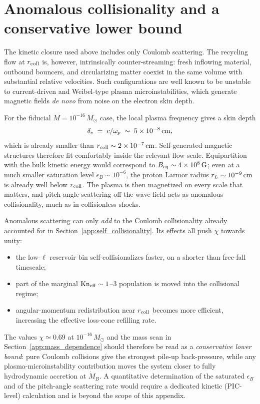 \documentclass[12pt]{article}
\newcommand{\Msun}{M_\odot}
\newcommand{\MdotB}{\dot{M}_B}
\newcommand{\rcoll}{r_{\rm coll}}
\newcommand{\Kn}{\mathrm{Kn}}
\begin{document}
\section{Anomalous collisionality and a conservative lower bound}
\label{app:anomalous}

The kinetic closure used above includes only Coulomb scattering. The
recycling flow at $\rcoll$ is, however, intrinsically counter-streaming:
fresh inflowing material, outbound bouncers, and circularizing matter
coexist in the same volume with substantial relative velocities. Such
configurations are well known to be unstable to current-driven and
Weibel-type plasma microinstabilities, which generate magnetic fields
\emph{de novo} from noise on the electron skin depth.

For the fiducial $M=10^{-16}\,\Msun$ case, the local plasma frequency
gives a skin depth
\begin{equation}
  \delta_e \;=\; c/\omega_p
  \;\sim\; 5\times10^{-8}\,{\rm cm},
\end{equation}
which is already smaller than $\rcoll\sim2\times10^{-7}\,{\rm cm}$.
Self-generated magnetic structures therefore fit comfortably inside
the relevant flow scale. Equipartition with the bulk kinetic energy
would correspond to $B_{\rm eq}\sim4\times10^{8}\,{\rm G}$; even at a
much smaller saturation level $\epsilon_B\sim10^{-6}$, the proton
Larmor radius $r_L\sim10^{-9}\,{\rm cm}$ is already well below
$\rcoll$. The plasma is then magnetized on every scale that matters,
and pitch-angle scattering off the wave field acts as anomalous
collisionality, much as in collisionless shocks.

Anomalous scattering can only \emph{add} to the Coulomb collisionality
already accounted for in Section~\ref{app:self_collisionality}. Its
effects all push $\chi$ towards unity:
\begin{itemize}
\item the low-$\ell$ reservoir bin self-collisionalizes faster, on a
shorter than free-fall timescale;
\item part of the marginal $\Kn_{\rm eff}\sim1$--$3$ population is
moved into the collisional regime;
\item angular-momentum redistribution near $\rcoll$ becomes more
efficient, increasing the effective loss-cone refilling rate.
\end{itemize}
The values $\chi\simeq0.69$ at $10^{-16}\,\Msun$ and the mass scan in
Section~\ref{app:mass_dependence} should therefore be read as a
\emph{conservative lower bound}: pure Coulomb collisions give the
strongest pile-up back-pressure, while any plasma-microinstability
contribution moves the system closer to fully hydrodynamic accretion
at $\MdotB$. A quantitative determination of the saturated
$\epsilon_B$ and of the pitch-angle scattering rate would require a
dedicated kinetic (PIC-level) calculation and is beyond the scope of
this appendix.
\end{document}

